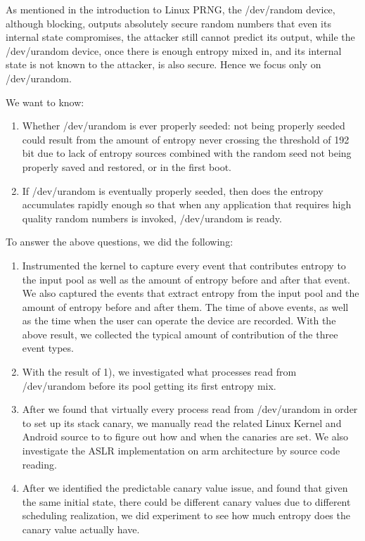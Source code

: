 As mentioned in the introduction to Linux PRNG, the /dev/random device, although blocking, outputs absolutely secure random numbers that even its internal state compromises, the attacker still cannot predict its output, while the /dev/urandom device, once there is enough entropy mixed in, and its internal state is not known to the attacker, is also secure. Hence we focus only on /dev/urandom.

We want to know:

\begin{enumerate}
\item Whether /dev/urandom is ever properly seeded: not being properly seeded could result from the amount of entropy never crossing the threshold of 192 bit due to lack of entropy sources combined with the random seed not being properly saved and restored, or in the first boot.

\item If /dev/urandom is eventually properly seeded, then does the entropy accumulates rapidly enough so that when any application that requires high quality random numbers is invoked, /dev/urandom is ready.

\end{enumerate}

To answer the above questions, we did the following:
\begin{enumerate}
\item Instrumented the kernel to capture every event that contributes entropy to the input pool as well as the amount of entropy before and after that event. We also captured the events that extract entropy from the input pool and the amount of entropy before and after them. The time of above events, as well as the time when the user can operate the device are recorded. With the above result, we collected the typical amount of contribution of the three event types.

\item With the result of 1), we investigated what processes read from /dev/urandom before its pool getting its first entropy mix.

\item After we found that virtually every process read from /dev/urandom in order to set up its stack canary, we manually read the related Linux Kernel and Android source to to figure out how and when the canaries are set. We also investigate the ASLR implementation on arm architecture by source code reading.

\item After we identified the predictable canary value issue, and found that given the same initial state, there could be different canary values due to different scheduling realization, we did experiment to see how much entropy does the canary value actually have.

\end{enumerate}




